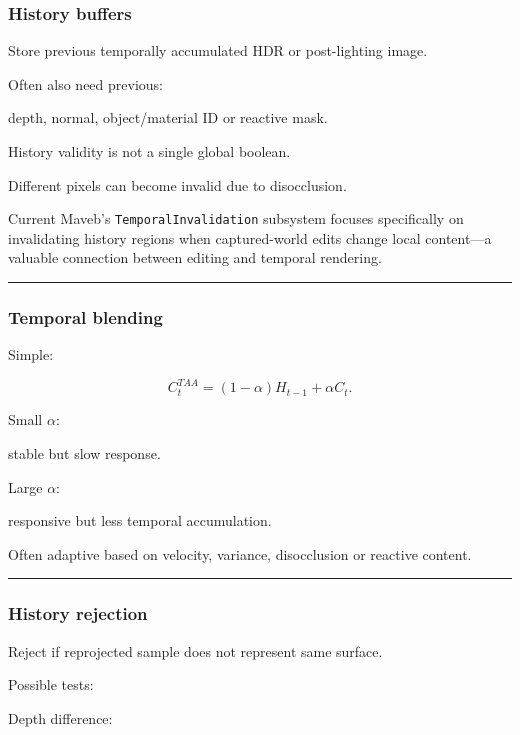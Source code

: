 \subsubsection{History buffers}\label{history-buffers}

Store previous temporally accumulated HDR or post-lighting image.

Often also need previous:

depth, normal, object/material ID or reactive mask.

History validity is not a single global boolean.

Different pixels can become invalid due to disocclusion.

Current Maveb's \texttt{TemporalInvalidation} subsystem focuses specifically on invalidating history regions when captured-world edits change local content---a valuable connection between editing and temporal rendering.

\begin{center}\rule{0.5\linewidth}{0.5pt}\end{center}

\subsubsection{Temporal blending}\label{temporal-blending}

Simple:

\[
\boxed{
C_t^{TAA}
=
(1-\alpha)
H_{t-1}
+
\alpha
C_t.
}
\]

Small \(\alpha\):

stable but slow response.

Large \(\alpha\):

responsive but less temporal accumulation.

Often adaptive based on velocity, variance, disocclusion or reactive content.

\begin{center}\rule{0.5\linewidth}{0.5pt}\end{center}

\subsubsection{History rejection}\label{history-rejection}

Reject if reprojected sample does not represent same surface.

Possible tests:

Depth difference:

